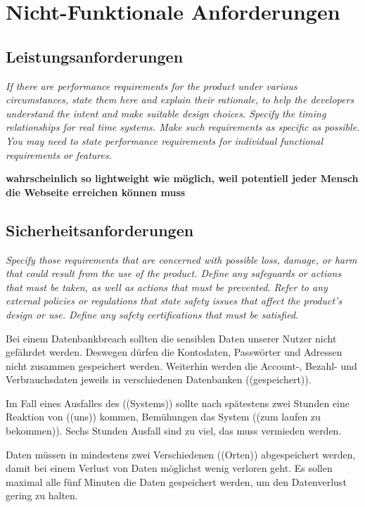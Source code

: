 \section{Nicht-Funktionale Anforderungen}

\subsection{Leistungsanforderungen}
\textit{If there are performance requirements for the product under various 
circumstances, state them here and explain their rationale, 
to help the developers understand the intent and make suitable design choices. 
Specify the timing relationships for real time systems. 
Make such requirements as specific as possible. 
You may need to state performance requirements 
for individual functional requirements or features.}

\textbf{wahrscheinlich so lightweight wie möglich, 
weil potentiell jeder Mensch die Webseite erreichen können muss}


\subsection{Sicherheitsanforderungen}
\textit{Specify those requirements that are concerned 
with possible loss, damage, or harm that could result from the use of the product. 
Define any safeguards or actions that must be taken, as well as actions that must be prevented. 
Refer to any external policies or regulations that state safety issues that affect the product’s design or use. 
Define any safety certifications that must be satisfied.}


Bei einem Datenbankbreach sollten die sensiblen Daten unserer Nutzer nicht 
gefährdet werden.
Deswegen dürfen die Kontodaten, Passwörter und Adressen nicht zusammen gespeichert werden.
Weiterhin werden die Account-, Bezahl- und Verbrauchsdaten jeweils in verschiedenen Datenbanken ((gespeichert)).

Im Fall eines Ausfalles des ((Systems)) sollte nach spätestens zwei Stunden
eine Reaktion von ((uns)) kommen, 
Bemühungen das System ((zum laufen zu bekommen)).
Sechs Stunden Ausfall sind zu viel, das muss vermieden werden.

Daten müssen in mindestens zwei Verschiedenen ((Orten)) 
abgespeichert werden, 
damit bei einem Verlust von Daten %
möglichst wenig verloren geht.
Es sollen maximal alle fünf Minuten die Daten gespeichert werden, 
um den Datenverlust gering zu halten. %




